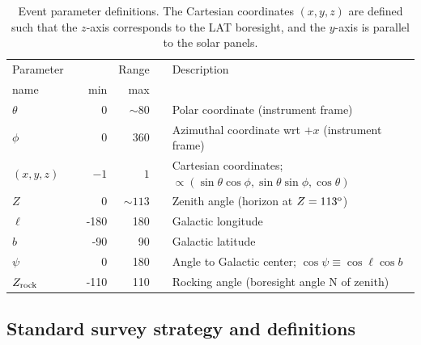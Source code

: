 \documentclass[aps,twocolumn,prd,superscriptaddress,showpacs,nofootinbib,fixfloat]{revtex4}
\newcommand{\degree}{^{\rm o}}
\newcommand{\zrock}{$Z_{\rm rock}$}
\begin{document}
\begin{table}
  \begin{center}
    \begin{tabular}{lcrrcl}
      \hline
      Parameter &\hphantom{i}& & Range &\hphantom{i}&  Description\\
      name      && min & max &&            \\
      \hline
      $\theta$ &&    0 &  $\sim80$ && Polar coordinate (instrument frame) \\
      $\phi$   &&    0 &       360 && Azimuthal coordinate wrt $+x$ (instrument frame) \\
      $(x,y,z)$&&  $-1$& $1$ && Cartesian coordinates;
      $\propto(\sin\theta\cos\phi, \sin\theta\sin\phi, \cos\theta)$\\
      $Z$      &&    0 & $\sim113$ && Zenith angle (horizon at $Z=113\degree$) \\
      $\ell$   && -180 & 180 && Galactic longitude \\
      $b$      &&  -90 &  90 && Galactic latitude \\
      $\psi$   &&    0 & 180 && Angle to Galactic center; $\cos\psi\equiv\cos\ell\cos b$ \\
      \zrock\  && -110 & 110 && Rocking angle (boresight angle N of zenith) \\
      \hline
    \end{tabular}
    \caption{Event parameter definitions. The Cartesian coordinates $(x, y, z)$ are
    defined such that the $z$-axis corresponds to the LAT boresight, and the
    $y$-axis is parallel to the solar panels.}
    \label{tab:parameters}
  \end{center}
\end{table}

\subsection{Standard survey strategy and definitions}
\label{sec:conventions}





\end{document}
